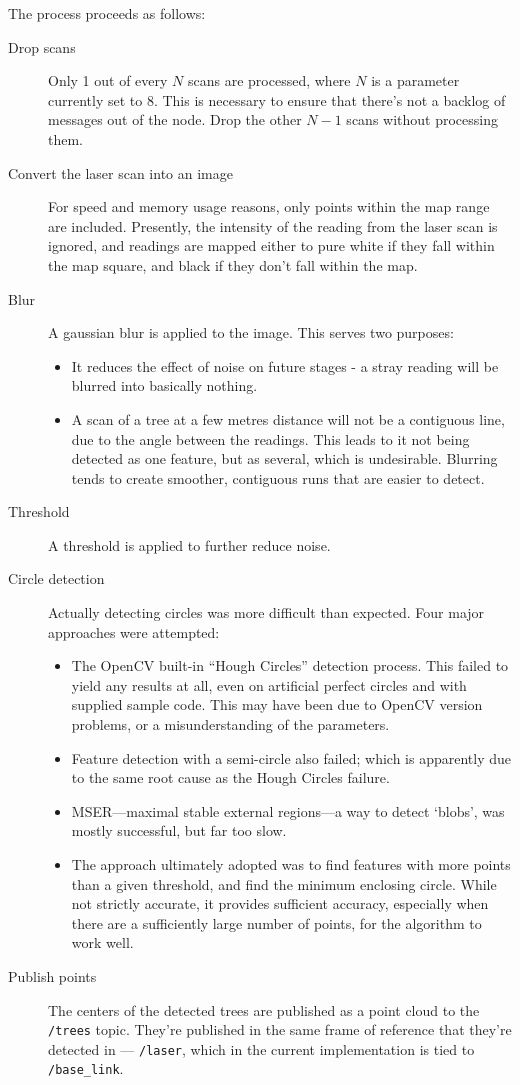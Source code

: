 \documentclass[12pt,oneside,a4paper]{book}
\begin{document}
The process proceeds as follows:
\begin{description}
\item[Drop scans] Only 1 out of every $N$ scans are processed, where
  $N$ is a parameter currently set to  8. This is
  necessary to ensure that there's not a backlog of messages out of
  the node. Drop the other $N-1$ scans without processing them.
\item[Convert the laser scan into an image] For speed and memory usage
  reasons, only points within the map range are included. Presently,
  the intensity of the reading from the laser scan is ignored, and
  readings are mapped either to pure white if they fall within the map
  square, and black if they don't fall within the map.
\item[Blur] A gaussian blur is applied to the image. This serves two
  purposes:
  \begin{itemize}
  \item It reduces the effect of noise on future stages - a stray
    reading will be blurred into basically nothing.
  \item A scan of a tree at a few metres distance will not be a
    contiguous line, due to the angle between the readings. This leads
    to it not being detected as one feature, but as several, which is
    undesirable. Blurring tends to create smoother, contiguous runs
    that are easier to detect.
  \end{itemize}
\item[Threshold] A threshold is applied to further reduce noise.
\item[Circle detection] Actually detecting circles was more difficult
  than expected. Four major approaches were attempted:
  \begin{itemize}
  \item The OpenCV built-in ``Hough Circles'' detection process. This
    failed to yield any results at all, even on artificial perfect
    circles and with supplied sample code. This may have been due to
    OpenCV version problems, or a misunderstanding of the parameters.
  \item Feature detection with a semi-circle also failed; which is
    apparently due to the same root cause as the Hough Circles
    failure.
  \item MSER---maximal stable external regions---a way to detect
    `blobs', was mostly successful, but far too slow.
  \item The approach ultimately adopted was to find features with more
    points than a given threshold, and find the minimum enclosing
    circle. While not strictly accurate, it provides sufficient
    accuracy, especially when there are a sufficiently large number of
    points, for the algorithm to work well.
  \end{itemize}
\item[Publish points] The centers of the detected trees are published
  as a point cloud to the \texttt{/trees} topic. They're published in
  the same frame of reference that they're detected in ---
  \texttt{/laser}, which in the current implementation is tied to
  \texttt{/base\_link}.
\end{description}
\end{document}

